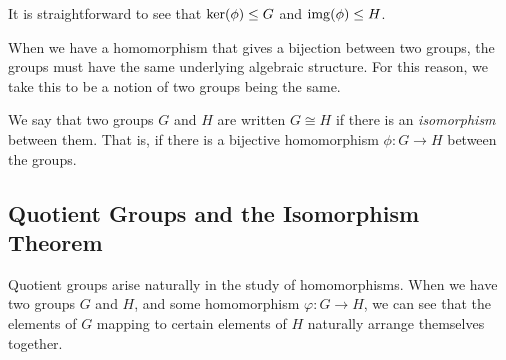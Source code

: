 \documentclass[a4paper]{scrartcl}
\begin{document}
It is straightforward to see that $\operatorname{ker}(\phi) \leq G$ and $\operatorname{img}(\phi) \leq H$.

When we have a homomorphism that gives a bijection between two groups, the groups must have the same underlying algebraic structure. For this reason, we take this to be a notion of two groups being the same.

\begin{definition}[Isomorphism]
  We say that two groups $G$ and $H$ are  written $G \cong H$ if there is an \emph{isomorphism} between them. That is, if there is a bijective homomorphism $\phi: G \rightarrow H$ between the groups.  
\end{definition}



\subsection{Quotient Groups and the Isomorphism Theorem}


Quotient groups arise naturally in the study of homomorphisms. When we have two groups $G$ and $H$, and some homomorphism $\varphi: G \rightarrow H$, we can see that the elements of $G$ mapping to certain elements of $H$ naturally arrange themselves together.
\end{document}
